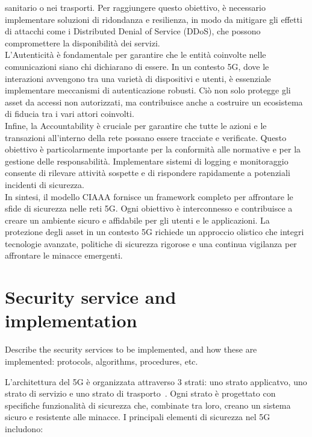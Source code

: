 \documentclass[english]{article}
\begin{document}
sanitario o nei trasporti. Per raggiungere questo obiettivo, è necessario
implementare soluzioni di ridondanza e resilienza, in modo da mitigare gli
effetti di attacchi come i Distributed Denial of Service (DDoS), che possono
compromettere la disponibilità dei servizi. \\ L'Autenticità è fondamentale per
garantire che le entità coinvolte nelle comunicazioni siano chi dichiarano di
essere. In un contesto 5G, dove le interazioni avvengono tra una varietà di
dispositivi e utenti, è essenziale implementare meccanismi di autenticazione
robusti. Ciò non solo protegge gli asset da accessi non autorizzati, ma
contribuisce anche a costruire un ecosistema di fiducia tra i vari attori
coinvolti. \\ Infine, la Accountability è cruciale per garantire che tutte le
azioni e le transazioni all'interno della rete possano essere tracciate e
verificate. Questo obiettivo è particolarmente importante per la conformità
alle normative e per la gestione delle responsabilità. Implementare sistemi di
logging e monitoraggio consente di rilevare attività sospette e di rispondere
rapidamente a potenziali incidenti di sicurezza. \\ In sintesi, il modello
CIAAA fornisce un framework completo per affrontare le sfide di sicurezza nelle
reti 5G. Ogni obiettivo è interconnesso e contribuisce a creare un ambiente
sicuro e affidabile per gli utenti e le applicazioni. La protezione degli asset
in un contesto 5G richiede un approccio olistico che integri tecnologie
avanzate, politiche di sicurezza rigorose e una continua vigilanza per
affrontare le minacce emergenti.
\section{Security service and implementation}
Describe the security services to be implemented, and how these are
implemented: protocols, algorithms, procedures, etc.

L'architettura del 5G è organizzata attraverso 3 strati: uno strato applicatvo,
uno strato di servizio e uno strato di trasporto~\cite{Jover2018Security}. Ogni
strato è progettato con specifiche funzionalità di sicurezza che, combinate tra
loro, creano un sistema sicuro e resistente alle minacce. I principali elementi
di sicurezza nel 5G includono:
\end{document}
